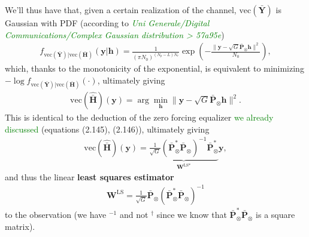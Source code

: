 \documentclass[a4paper, 12pt]{book}
\begin{document}
We'll thus have that, given a certain realization of the channel, $\text{vec}(\bar{\boldsymbol{Y}})$ is Gaussian with PDF (according to \textit{\textcolor{green}{Uni Generale/Digital Communications/Complex Gaussian distribution > 57a95e}})
\begin{align}
f_{\text{vec}(\bar{\boldsymbol{Y}})|\text{vec}(\bar{\boldsymbol{H}})}(\boldsymbol{y}|\mathbf{h}) = \frac{1}{(\pi N_0)^{(N_p-L)N_r}} \exp \left( - \frac{\| \boldsymbol{y} - \sqrt{G}\bar{\boldsymbol{P}}_{\otimes}\mathbf{h} \|^2}{N_0} \right), \tag{2.230}
\end{align}
which, thanks to the monotonicity of the exponential, is equivalent to minimizing $-\log f_{\text{vec}(\bar{\boldsymbol{Y}})|\text{vec}(\bar{\boldsymbol{H}})}(\cdot)$, ultimately giving
\begin{align}
\text{vec}(\hat{\bar{\boldsymbol{H}}})(\mathbf{y}) = \arg \min_{\mathbf{h}} \| \boldsymbol{y} - \sqrt{G}\bar{\boldsymbol{P}}_{\otimes}\mathbf{h} \|^2. \tag{2.232}
\end{align}
This is identical to the deduction of the zero forcing equalizer \textcolor{green}{we already discussed} (equations (2.145), (2.146)), ultimately giving
\begin{align}
\text{vec}(\hat{\bar{\boldsymbol{H}}})(\mathbf{y}) = \underbrace{\frac{1}{\sqrt{G}}(\bar{\boldsymbol{P}}_{\otimes}^*\bar{\boldsymbol{P}}_{\otimes})^{-1}\bar{\boldsymbol{P}}_{\otimes}^*}_{\boldsymbol{W}^{\text{LS}*}}\boldsymbol{y}, \tag{2.233}
\end{align}
and thus the linear \textbf{least squares estimator}
\begin{align}
\boldsymbol{W}^{\text{LS}} = \frac{1}{\sqrt{G}}\bar{\boldsymbol{P}}_{\otimes}(\bar{\boldsymbol{P}}_{\otimes}^*\bar{\boldsymbol{P}}_{\otimes})^{-1} \tag{2.233+}
\end{align}
to the observation (we have $^{-1}$ and not $^{\dagger}$ since we know that $\bar{\boldsymbol{P}}_{\otimes}^*\bar{\boldsymbol{P}}_{\otimes}$ is a square matrix).
\end{document}
